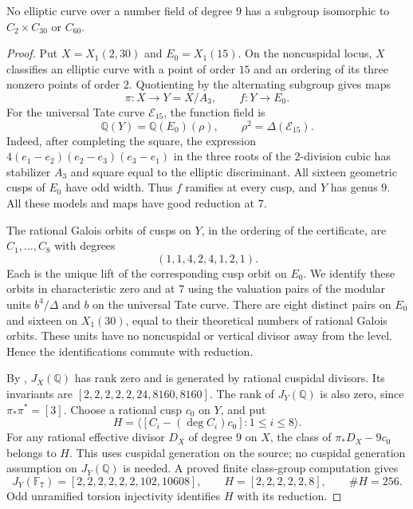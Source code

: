 \begin{proposition}\label{prop:nonic-no230}
No elliptic curve over a number field of degree $9$ has a subgroup
isomorphic to $C_2\times C_{30}$ or $C_{60}$.
\end{proposition}
\begin{proof}
Put $X=X_1(2,30)$ and $E_0=X_1(15)$. On the noncuspidal locus,
$X$ classifies an elliptic curve with a point of order $15$ and an
ordering of its three nonzero points of order $2$. Quotienting by the
alternating subgroup gives maps
\[
 \pi:X\longrightarrow Y=X/A_3,\qquad f:Y\longrightarrow E_0.
\]
For the universal Tate curve $\mathcal E_{15}$, the function field is
\[
 \mathbb Q(Y)=\mathbb Q(E_0)(\rho),\qquad
 \rho^2=\Delta(\mathcal E_{15}).
\]
Indeed, after completing the square, the expression
$4(e_1-e_2)(e_2-e_3)(e_3-e_1)$ in the three roots of the
$2$-division cubic has stabilizer $A_3$ and square equal to the
elliptic discriminant. All sixteen geometric cusps of $E_0$ have odd
width. Thus $f$ ramifies at every cusp, and $Y$ has genus $9$.
All these models and maps have good reduction at $7$.

The rational Galois orbits of cusps on $Y$, in the ordering of the
certificate, are $C_1,\ldots,C_8$ with degrees
\[
 (1,1,4,2,4,1,2,1).
\]
Each is the unique lift of the corresponding cusp orbit on $E_0$.
We identify these orbits in characteristic zero and at $7$ using the
valuation pairs of the modular units $b^4/\Delta$ and $b$ on the
universal Tate curve. There are eight distinct pairs on $E_0$ and
sixteen on $X_1(30)$, equal to their theoretical numbers of rational
Galois orbits. These units have no noncuspidal or vertical divisor
away from the level. Hence the identifications commute with reduction.

By \cite[Theorem~3.1, Proposition~4.16 and Table~3]{DEHMZ},
$J_X(\mathbb Q)$ has rank zero and is generated by rational cuspidal
divisors. Its invariants are
$[2,2,2,2,2,24,8160,8160]$. The rank of $J_Y(\mathbb Q)$ is also
zero, since $\pi_*\pi^*=[3]$.
Choose a rational cusp $c_0$ on $Y$, and put
\[
 H=\langle[C_i-(\deg C_i)c_0]:1\leq i\leq8\rangle.
\]
For any rational effective divisor $D_X$ of degree $9$ on $X$, the
class of $\pi_*D_X-9c_0$ belongs to $H$. This uses cuspidal generation
on the source; no cuspidal generation assumption on $J_Y(\mathbb Q)$
is needed. A proved finite class-group computation gives
\[
 J_Y(\mathbb F_7)=[2,2,2,2,2,2,102,10608],\qquad
 H=[2,2,2,2,2,8],\qquad \#H=256.
\]
Odd unramified torsion injectivity identifies $H$ with its reduction.


\end{proof}
